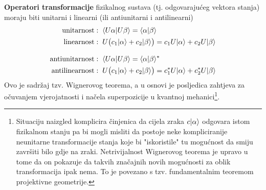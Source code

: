 \textbf{Operatori transformacije} fizikalnog sustava (tj. odgovarajućeg vektora
stanja) moraju biti unitarni i linearni (ili antiunitarni i antilinearni)
\begin{align*}
\text{unitarnost}&:\; \langle U\alpha |U\beta\rangle = \langle \alpha |\beta\rangle
   \\
\text{linearnost}&:\; U\big(c_1| \alpha \rangle+c_{2}| \beta \rangle\big)=
  c_1 U| \alpha \rangle + c_{2} U| \beta \rangle
   \\[2ex]
\text{antiunitarnost}&:\; \langle U\alpha |U\beta\rangle = \langle \alpha |\beta\rangle^*
  \\
\text{antilinearnost}&:\; U\big(c_1| \alpha \rangle+c_{2}| \beta \rangle\big)=
  c_{1}^* U| \alpha \rangle + c_{2}^* U| \beta \rangle
\end{align*}
Ovo je sadržaj tzv. Wignerovog teorema, a u osnovi
je posljedica zahtjeva za očuvanjem vjerojatnosti i
načela superpozicije u kvantnoj mehanici\footnote{Situaciju
naizgled komplicira činjenica da cijela zraka
$c| \alpha \rangle$ odgovara istom fizikalnom stanju pa bi mogli
misliti da postoje neke kompliciranije neunitarne transformacije stanja
koje bi "iskoristile" tu
mogućnost da smiju završiti bilo gdje na zraki. Netrivijalnost
Wignerovog teorema je upravo u tome da on pokazuje da takvih
značajnih novih mogućnosti za oblik transformacija ipak nema. To
je povezano s tzv. fundamentalnim teoremom projektivne geometrije.}.

